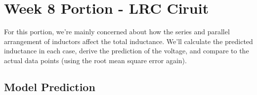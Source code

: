 \documentclass{article}
\begin{document}
\newpage

\section{Week 8 Portion - LRC Ciruit}

For this portion, we're mainly concerned about how the series and parallel arrangement of inductors affect the total inductance. We'll calculate the predicted inductance in each case, derive the prediction of the voltage, and compare to the actual data points (using the root mean square error again). 

\hfil

\subsection{Model Prediction}
\end{document}
